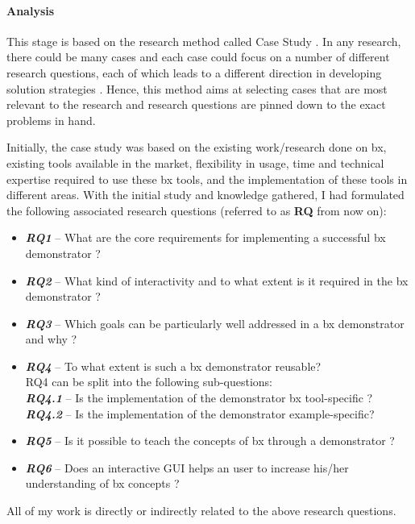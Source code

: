 \paragraph{Analysis}
This stage is based on the research method called Case Study \cite{semethods}. In any research, there could be many cases and each case could focus on a number of different research questions, each of which leads to a different direction in developing solution strategies \cite{semethods}. Hence, this method aims at selecting cases that are most relevant to the research and research questions are pinned down to the exact problems in hand. 

Initially, the case study was based on the existing work/research done on bx, existing tools available in the market, flexibility in usage, time and technical expertise required to use these bx tools, and the implementation of these tools in different areas. With the initial study and knowledge gathered, I had formulated the following associated research questions (referred to as \textbf{RQ} from now on):
\begin{itemize}
\item {\textbf{\textit{RQ1}} -- What are the core requirements for implementing a successful bx demonstrator ?}
\item {\textbf{\textit{RQ2}} -- What kind of interactivity and to what extent is it required in the bx demonstrator ?}
\item {\textbf{\textit{RQ3}} -- Which goals can be particularly well addressed in a bx demonstrator and why ?}
\item {\textbf{\textit{RQ4}} -- To what extent is such a bx demonstrator reusable?}
\\RQ4 can be split into the following sub-questions:
\\\textbf{\textit{RQ4.1}} -- Is the implementation of the demonstrator bx tool-specific ?
\\\textbf{\textit{RQ4.2}} -- Is the implementation of the demonstrator example-specific?
\item {\textbf{\textit{RQ5}} -- Is it possible to teach the concepts of bx through a demonstrator ?}
\item {\textbf{\textit{RQ6}} -- Does an interactive GUI helps an user to increase his/her understanding of bx concepts ?}
\end{itemize}
All of my work is directly or indirectly related to the above research questions.

